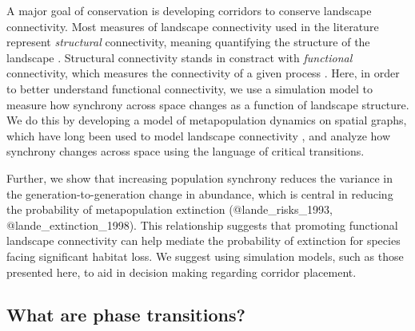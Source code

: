 \documentclass[]{article}
\begin{document}
A major goal of conservation is developing corridors to conserve
landscape connectivity. Most measures of landscape connectivity used in the literature represent \emph{structural} connectivity, meaning quantifying the
structure of the landscape \cite{}. Structural connectivity stands in constract with \emph{functional} connectivity, which measures the connectivity of a given process \cite{kool_population_2013, calabrese_comparison-shoppers_2004}. Here,
in order to better understand functional connectivity, we use a
simulation model to measure how synchrony across space changes as a
function of landscape structure. We do this by developing a model of
metapopulation dynamics on spatial graphs, which have long been used to
model landscape connectivity \cite{martensen_spatio-temporal_2017,
@albert_applying_2017, @urban_landscape_2001}, and analyze how
synchrony changes across space using the language of critical
transitions.

Further, we show that increasing population synchrony reduces the
variance in the generation-to-generation change in abundance, which is
central in reducing the probability of metapopulation extinction
(@lande\_risks\_1993, @lande\_extinction\_1998). This relationship
suggests that promoting functional landscape connectivity can help
mediate the probability of extinction for species facing significant
habitat loss. We suggest using simulation models, such as those
presented here, to aid in decision making regarding corridor placement.


\hypertarget{what-are-phase-transitions}{%
\subsection{What are phase
transitions?}\label{what-are-phase-transitions}}
\end{document}
